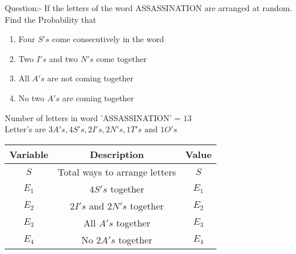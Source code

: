 \documentclass[journal,12pt,twocolumn]{IEEEtran}
\theoremstyle{remark}
\begin{document}
%
Question:-
If the letters of the word ASSASSINATION are arranged at random. Find the Probability that
\begin{enumerate}[label=(\alph*)]
\item Four $S's$ come consecutively in the word
\item Two  $I's$ and two $N's$ come together
\item All $A's$ are not coming together
\item No two $A's$ are coming together
\end{enumerate}
\solution 
Number of letters in word 'ASSASSINATION' = $13$\\
Letter's are $3A's, 4S's, 2I's, 2N's, 1T's \text{ and } 1O's$\\

\begin{tabular}{|c|c|c|} \hline
Variable & Description & Value\\\hline
$S$ & Total ways to arrange letters & $S$\\\hline
$E_1$ & $4S's$ together & $E_1$\\\hline
$E_2$ & $2I's$ and $2N's$ together & $E_2$\\\hline
$E_3$ & All $A's$ together &  $E_3$ \\\hline
$E_4$ & No $2A's$ together & $E_4$\\\hline 

\end{tabular}\\
\end{document}
